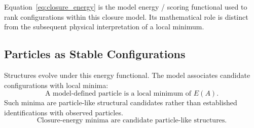 Equation~\eqref{eq:closure_energy} is the model energy / scoring functional
used to rank configurations within this closure model. Its mathematical role
is distinct from the subsequent physical interpretation of a local minimum.

\subsection{Particles as Stable Configurations}

Structures evolve under this energy functional.
The model associates candidate configurations with local minima:
\begin{equation}
  \boxed{\text{A model-defined particle is a local minimum of } E(A).}
\end{equation}
Such minima are particle-like structural candidates rather than established
identifications with observed particles.
\begin{equation}
  \boxed{\text{Closure-energy minima are candidate particle-like structures.}}
\end{equation}
